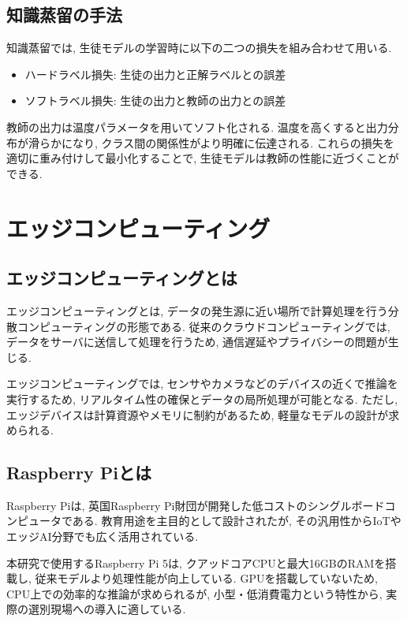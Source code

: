 \subsection{知識蒸留の手法}

知識蒸留では, 生徒モデルの学習時に以下の二つの損失を組み合わせて用いる.

\begin{itemize}
\item ハードラベル損失: 生徒の出力と正解ラベルとの誤差
\item ソフトラベル損失: 生徒の出力と教師の出力との誤差
\end{itemize}

教師の出力は温度パラメータを用いてソフト化される. 
温度を高くすると出力分布が滑らかになり, クラス間の関係性がより明確に伝達される. 
これらの損失を適切に重み付けして最小化することで, 生徒モデルは教師の性能に近づくことができる.

\section{エッジコンピューティング}

\subsection{エッジコンピューティングとは}

エッジコンピューティングとは, データの発生源に近い場所で計算処理を行う分散コンピューティングの形態である. 
従来のクラウドコンピューティングでは, データをサーバに送信して処理を行うため, 通信遅延やプライバシーの問題が生じる.

エッジコンピューティングでは, センサやカメラなどのデバイスの近くで推論を実行するため, リアルタイム性の確保とデータの局所処理が可能となる. 
ただし, エッジデバイスは計算資源やメモリに制約があるため, 軽量なモデルの設計が求められる.

\subsection{Raspberry Piとは}

Raspberry Piは, 英国Raspberry Pi財団が開発した低コストのシングルボードコンピュータである. 
教育用途を主目的として設計されたが, その汎用性からIoTやエッジAI分野でも広く活用されている.

本研究で使用するRaspberry Pi 5は, クアッドコアCPUと最大16GBのRAMを搭載し, 従来モデルより処理性能が向上している. 
GPUを搭載していないため, CPU上での効率的な推論が求められるが, 小型・低消費電力という特性から, 実際の選別現場への導入に適している.